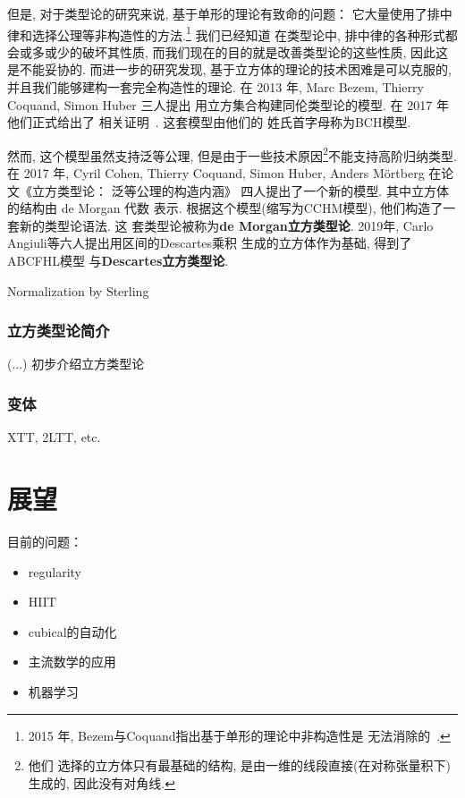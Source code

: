 \documentclass[UTF8]{ctexbook}
\theoremstyle{plain}
\theoremstyle{definition}
\theoremstyle{remark}
\begin{document}
但是, 对于类型论的研究来说, 基于单形的理论有致命的问题：
它大量使用了排中律和选择公理等非构造性的方法.\footnote{2015
年, Bezem与Coquand指出基于单形的理论中非构造性是
无法消除的~\cite{bezem:2015:simplicial}.} 我们已经知道
在类型论中, 排中律的各种形式都会或多或少的破坏其性质,
而我们现在的目的就是改善类型论的这些性质, 因此这是不能妥协的.
而进一步的研究发现, 基于立方体的理论的技术困难是可以克服的,
并且我们能够建构一套完全构造性的理论. 在 2013 年,
Marc Bezem, Thierry Coquand, Simon Huber 三人提出
用立方集合构建同伦类型论的模型. 在 2017 年他们正式给出了
相关证明~\cite{bch:2017:cubical}. 这套模型由他们的
姓氏首字母称为BCH模型.

然而, 这个模型虽然支持泛等公理, 但是由于一些技术原因\footnote{他们
选择的立方体只有最基础的结构, 是由一维的线段直接(在对称张量积下)生成的,
因此没有对角线.}不能支持高阶归纳类型. 在 2017 年,
Cyril Cohen, Thierry Coquand, Simon Huber, Anders M\"ortberg
在论文《立方类型论： 泛等公理的构造内涵》
四人提出了一个新的模型. 其中立方体的结构由 de Morgan 代数
表示. 根据这个模型(缩写为CCHM模型), 他们构造了一套新的类型论语法. 这
套类型论被称为\textbf{de Morgan立方类型论}.
2019年, Carlo Angiuli等六人提出用区间的Descartes乘积
生成的立方体作为基础, 得到了ABCFHL模型
与\textbf{Descartes立方类型论}.

Normalization by Sterling

\subsection{立方类型论简介}

(...) 初步介绍立方类型论

\subsection{变体}

XTT, 2LTT, etc.

\chapter{展望}
目前的问题：
\begin{itemize}
\item regularity
\item HIIT
\item cubical的自动化
\item 主流数学的应用
\item 机器学习
\end{itemize}

\printbibliography[title=参考文献]
\end{document}
